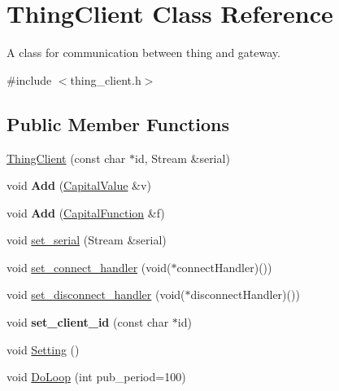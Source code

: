 \hypertarget{classThingClient}{\section{Thing\-Client Class Reference}
\label{classThingClient}
}


A class for communication between thing and gateway.  




{\ttfamily \#include $<$thing\-\_\-client.\-h$>$}

\subsection*{Public Member Functions}
\begin{DoxyCompactItemize}
\item 
\hyperlink{classThingClient_a771f683ab76f89a2b22c85a5647df1e3}{Thing\-Client} (const char $\ast$id, Stream \&serial)
\item 
\hypertarget{classThingClient_a4f21f41869c7b1e01c62ef7939b247b5}{void {\bfseries Add} (\hyperlink{classCapitalValue}{Capital\-Value} \&v)}\label{classThingClient_a4f21f41869c7b1e01c62ef7939b247b5}

\item 
\hypertarget{classThingClient_ab2f23f07a087ef56bd57cdf77bac9b4f}{void {\bfseries Add} (\hyperlink{classCapitalFunction}{Capital\-Function} \&f)}\label{classThingClient_ab2f23f07a087ef56bd57cdf77bac9b4f}

\item 
void \hyperlink{classThingClient_aedab0c0ee3c96530eb6beed1f2a459b6}{set\-\_\-serial} (Stream \&serial)
\item 
void \hyperlink{classThingClient_afbfe83248b51bbbf484d19c11e8202a7}{set\-\_\-connect\-\_\-handler} (void($\ast$connect\-Handler)())
\item 
void \hyperlink{classThingClient_a598656f81507d9e295149379a06d6cbc}{set\-\_\-disconnect\-\_\-handler} (void($\ast$disconnect\-Handler)())
\item 
\hypertarget{classThingClient_a61c3913c2a50be164e9a239d1ac42363}{void {\bfseries set\-\_\-client\-\_\-id} (const char $\ast$id)}\label{classThingClient_a61c3913c2a50be164e9a239d1ac42363}

\item 
void \hyperlink{classThingClient_a9afef6f565bd4277939406ef6a324bfe}{Setting} ()
\item 
void \hyperlink{classThingClient_a27695ee5231952c6aa1d9431b1ea884d}{Do\-Loop} (int pub\-\_\-period=100)
\end{DoxyCompactItemize}
